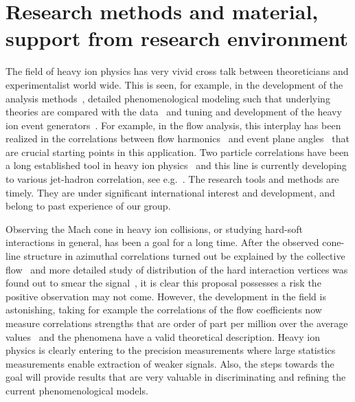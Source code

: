 \section{Research methods and material, support from research environment} %
\label{sec:researchmethods}

The field of heavy ion physics has very vivid cross talk between theoreticians and experimentalist world wide. This is seen, for example, in the development of the analysis methods~\cite{Poskanzer:1998yz,Bilandzic:2010jr}, detailed phenomenological modeling such that underlying theories are compared with the data~\cite{Burke:2013yra,Renk:2011gj,Niemi:2015qia} and tuning and development of the heavy ion event generators~\cite{Gyulassy:1994ew,Lin:2004en,Lokhtin2006}. For example, in the flow analysis, this interplay has been realized in the correlations between flow harmonics~\cite{Poskanzer:1998yz,ALICE:2011ab} and event plane angles~\cite{Aad:2014fla,Bhalerao:2014xra} that are crucial starting points in this application. Two particle correlations have been a long established tool in heavy ion physics~\cite{PhysRevLett.95.152301,PhysRevLett.97.052301} and this line is currently developing to various jet-hadron correlation, see e.g.~\cite{Khachatryan:2016tfj}. The research tools and methods are timely. They are under significant international interest and development, and belong to past experience of our group.

Observing the Mach cone in heavy ion collisions, or studying hard-soft interactions in general, has been a goal for a long time. After the observed cone-line structure in azimuthal correlations turned out be explained by the collective flow~\cite{ALICE:2011ab} and more detailed study of distribution of the hard interaction vertices was found out to smear the signal~\cite{Tachibana:2015qxa}, it is clear this proposal possesses a risk the positive observation may not come. However, the development in the field is astonishing, taking for example the correlations of the flow coefficients now measure correlations strengths that are order of part per million over the average values~\cite{ALICE:2016kpq} and the phenomena have a valid theoretical description. Heavy ion physics is clearly entering to the precision measurements where large statistics measurements enable extraction of weaker signals. Also, the steps towards the goal will provide results that are very valuable in discriminating and refining the current phenomenological models.

